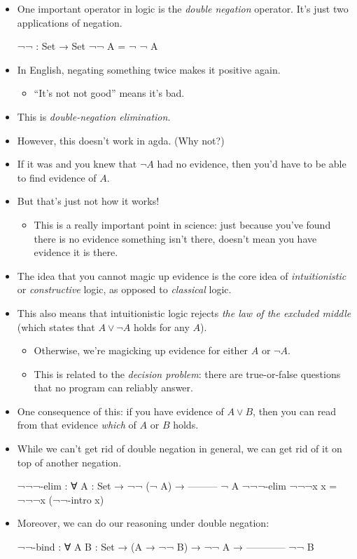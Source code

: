 \documentclass{lecturenotes}
\begin{document}
\begin{itemize}
\item One important operator in logic is the \emph{double negation} operator.
  It's just two applications of negation.
\begin{code}
¬¬ : Set → Set
¬¬ A = ¬ ¬ A    
\end{code}
\item In English, negating something twice makes it positive again.
  \begin{itemize}
  \item ``It's not not good'' means it's bad.
  \end{itemize}
\item This is \emph{double-negation elimination}.
\item However, this doesn't work in agda. (Why not?)
\item If it was and you knew that $\lnot A$ had no evidence, then you'd have to be able to find evidence of $A$.
\item But that's just not how it works!
  \begin{itemize}
  \item This is a really important point in science: just because you've found there is no evidence something isn't there, doesn't mean you have evidence it is there.
  \end{itemize}
\item The idea that you cannot magic up evidence is the core idea of \emph{intuitionistic} or \emph{constructive} logic, as opposed to \emph{classical} logic.
\item This also means that intuitionistic logic rejects \emph{the law of the excluded middle} (which states that $A \lor \lnot A$ holds for any $A$).
  \begin{itemize}
  \item Otherwise, we're magicking up evidence for either $A$ or $\lnot A$.
  \item This is related to the \emph{decision problem}: there are true-or-false questions that no program can reliably answer.
  \end{itemize}
\item One consequence of this: if you have evidence of $A \lor B$, then you can read from that evidence \emph{which} of $A$ or $B$ holds.
\item While we can't get rid of double negation in general, we can get rid of it on top of another negation.
\begin{code}
¬¬¬-elim : ∀ {A : Set} →
  ¬¬ (¬ A) →
  ---------
    ¬ A
¬¬¬-elim ¬¬¬x x = ¬¬¬x (¬¬-intro x)    
\end{code}
\item Moreover, we can do our reasoning under double negation:
\begin{code}
¬¬-bind : ∀ {A B : Set} →
   (A → ¬¬ B) →
     ¬¬ A →
  ------------
     ¬¬ B
       

\end{code}
\end{itemize}
\end{document}
